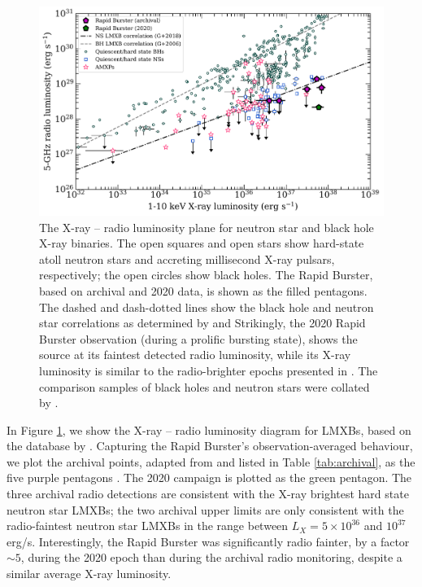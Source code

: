 \documentclass[fleqn,usenatbib]{mnras}
\begin{document}
\begin{figure}
\includegraphics[width=\textwidth]{LxLr.pdf}
 \caption{The X-ray -- radio luminosity plane for neutron star and black hole X-ray binaries. The open squares and open stars show hard-state atoll neutron stars and accreting millisecond X-ray pulsars, respectively; the open circles show black holes. The Rapid Burster, based on archival and 2020 data, is shown as the filled pentagons. The dashed and dash-dotted lines show the black hole and neutron star correlations as determined by \citet{gallo2006} and \citet{gallo18} Strikingly, the 2020 Rapid Burster observation (during a prolific bursting state), shows the source at its faintest detected radio luminosity, while its X-ray luminosity is similar to the radio-brighter epochs presented in \citet[][when no bursting was observed]{moore2000}. The comparison samples of black holes and neutron stars were collated by \citet{bahramian2022}.}
 \label{fig:LxLr}
\end{figure}

In Figure \ref{fig:LxLr}, we show the X-ray -- radio luminosity diagram for LMXBs, based on the database by \citet{bahramian2022}. Capturing the Rapid Burster's observation-averaged behaviour, we plot the archival points, adapted from \citet{moore2000} and listed in Table \ref{tab:archival}, as the five purple pentagons \citep[due to the lack of X-ray information, we do not include the data from][]{tudor2022}. The 2020 campaign is plotted as the green pentagon. The three archival radio detections are consistent with the X-ray brightest hard state neutron star LMXBs; the two archival upper limits are only consistent with the radio-faintest neutron star LMXBs in the range between $L_X = 5\times10^{36}$ and $10^{37}$ erg/s. Interestingly, the Rapid Burster was significantly radio fainter, by a factor $\sim 5$, during the 2020 epoch than during the archival radio monitoring, despite a similar average X-ray luminosity.
\end{document}
